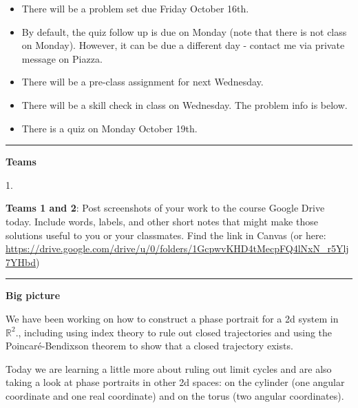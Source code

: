 \documentclass[12pt,letterpaper,noanswers]{exam}
\begin{document}
 \pdfpageheight 11in 
  \pdfpagewidth 8.5in

\noindent 




\begin{itemize}
    \item There will be a problem set due Friday October 16th.
    \item By default, the quiz follow up is due on Monday (note that there is not class on Monday).  However, it can be due a different day - contact me via private message on Piazza.
    \item There will be a pre-class assignment for next Wednesday.
    \item There will be a skill check in class on Wednesday.  The problem info is below.
    \item There is a quiz on Monday October 19th.
\end{itemize}

\hrule
\vspace{0.2cm}





\noindent\textbf{Teams}

\begin{multicols}{2}
1. 

\end{multicols}

\noindent \textbf{Teams 1 and 2}: Post screenshots of your work to the course Google Drive today.  Include words, labels, and other short notes that might make those solutions useful to you or your classmates.  Find the link in Canvas (or here: \url{https://drive.google.com/drive/u/0/folders/1GcpwvKHD4tMecpFQ4lNxN_r5Ylj7YHbd})

\vspace{0.2cm}

\hrule
\vspace{0.2cm}

\noindent\textbf{Big picture}

We have been working on how to construct a phase portrait for a 2d system in $\mathbb{R}^2.$, including using index theory to rule out closed trajectories and using the Poincar\'e-Bendixson theorem to show that a closed trajectory exists. 

Today we are learning a little more about ruling out limit cycles and are also taking a look at phase portraits in other 2d spaces: on the cylinder (one angular coordinate and one real coordinate) and on the torus (two angular coordinates).
\end{document}
